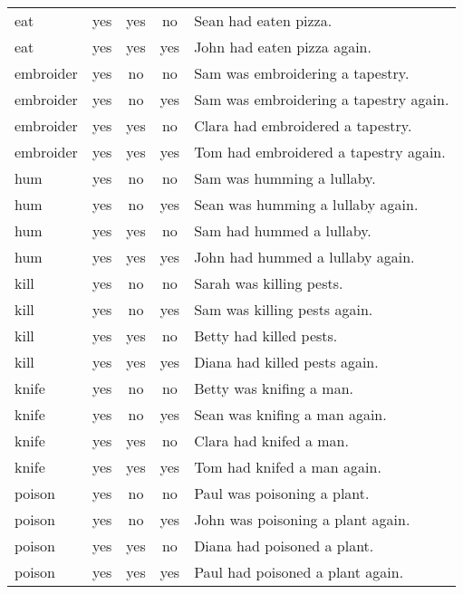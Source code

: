 \begin{longtable}{l|ccc|p{5cm}}
eat       & yes  & yes  & no   & Sean had eaten pizza.                        \\
eat       & yes  & yes  & yes  & John had eaten pizza again.                  \\
embroider & yes  & no   & no   & Sam was embroidering a tapestry.             \\
embroider & yes  & no   & yes  & Sam was embroidering a tapestry again.       \\
embroider & yes  & yes  & no   & Clara had embroidered a tapestry.            \\
embroider & yes  & yes  & yes  & Tom had embroidered a tapestry again.        \\
hum       & yes  & no   & no   & Sam was humming a lullaby.                   \\
hum       & yes  & no   & yes  & Sean was humming a lullaby again.            \\
hum       & yes  & yes  & no   & Sam had hummed a lullaby.                    \\
hum       & yes  & yes  & yes  & John had hummed a lullaby again.             \\
kill      & yes  & no   & no   & Sarah was killing pests.                     \\
kill      & yes  & no   & yes  & Sam was killing pests again.                 \\
kill      & yes  & yes  & no   & Betty had killed pests.                      \\
kill      & yes  & yes  & yes  & Diana had killed pests again.                \\
knife     & yes  & no   & no   & Betty was knifing a man.                     \\
knife     & yes  & no   & yes  & Sean was knifing a man again.                \\
knife     & yes  & yes  & no   & Clara had knifed a man.                      \\
knife     & yes  & yes  & yes  & Tom had knifed a man again.                  \\
poison    & yes  & no   & no   & Paul was poisoning a plant.                  \\
poison    & yes  & no   & yes  & John was poisoning a plant again.            \\
poison    & yes  & yes  & no   & Diana had poisoned a plant.                  \\
poison    & yes  & yes  & yes  & Paul had poisoned a plant again.             \\

\end{longtable}
